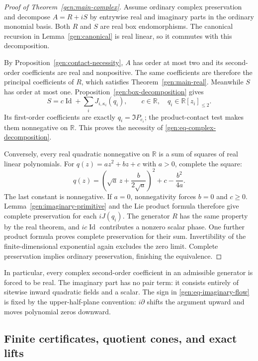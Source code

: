 \documentclass[reqno]{amsart}
\theoremstyle{definition}
\theoremstyle{remark}
\newcommand{\R}{\mathbb R}
\DeclareMathOperator{\Id}{Id}
\begin{document}
\begin{proof}[Proof of Theorem~\ref{gen:main-complex}]
Assume ordinary complex preservation and decompose \(A=R+iS\)
by entrywise real and imaginary parts in the ordinary monomial
basis.  Both \(R\) and \(S\) are real box endomorphisms.
The canonical recursion in Lemma~\ref{gen:canonical} is real
linear, so it commutes with this decomposition.

By Proposition~\ref{gen:contact-necessity}, \(A\) has order
at most two and its second-order coefficients are real and
nonpositive.  The same coefficients are therefore the
principal coefficients of \(R\), which satisfies
Theorem~\ref{gen:main-real}.  Meanwhile \(S\) has order at most
one.  Proposition~\ref{gen:box-decomposition} gives
\[
 S=c\Id+\sum_iJ_{i,\kappa_i}(q_i),
 \qquad c\in\R,\quad q_i\in\R[z_i]_{\leq2}.
\]
Its first-order coefficients are exactly
\(q_i=\Im P_{e_i}\); the product-contact test makes them
nonnegative on \(\R\).  This proves the necessity of
\eqref{gen:eq-complex-decomposition}.

Conversely, every real quadratic nonnegative on \(\R\) is a
sum of squares of real linear polynomials.
For \(q(z)=az^2+bz+c\) with \(a>0\), complete the square:
\[
 q(z)=\left(\sqrt a\,z+\frac b{2\sqrt a}\right)^2
            +c-\frac{b^2}{4a}.
\]
The last constant is nonnegative.
If \(a=0\), nonnegativity forces \(b=0\) and \(c\geq0\).
Lemma~\ref{gen:imaginary-primitive} and the Lie product formula
therefore give complete preservation for each \(iJ(q_i)\).
The generator \(R\) has the same property by the real theorem,
and \(ic\Id\) contributes a nonzero scalar phase.
One further product formula proves complete preservation for
their sum.  Invertibility of the finite-dimensional exponential
again excludes the zero limit.
Complete preservation implies ordinary preservation, finishing
the equivalence.
\end{proof}

In particular, every complex second-order coefficient in an
admissible generator is forced to be real.  The imaginary part
has no pair term: it consists entirely of sitewise inward
quadratic fields and a scalar.
The sign in \eqref{gen:eq-imaginary-flow} is fixed by the
upper-half-plane convention: \(i\partial\) shifts the argument
upward and moves polynomial zeros downward.

\subsection{Finite certificates, quotient cones, and exact lifts}
\label{gen:subsec-certificates}
\end{document}
